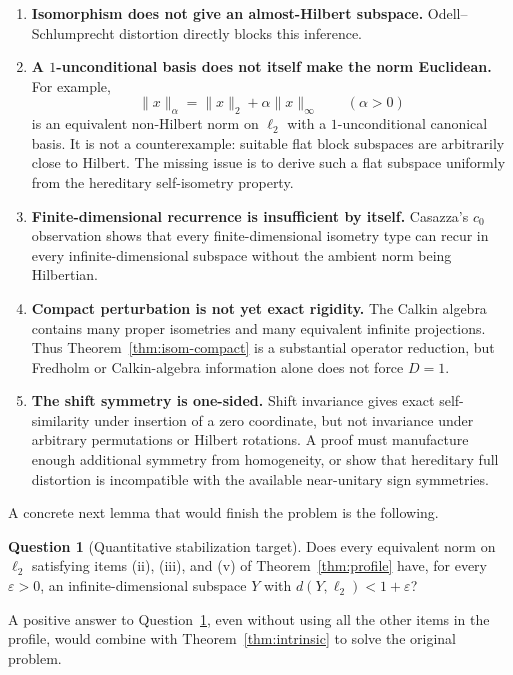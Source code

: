 \documentclass[11pt]{article}
\theoremstyle{definition}
\newtheorem{question}[theorem]{Question}
\begin{document}
\begin{enumerate}[label=\textbf{B\arabic*.}]
\item \textbf{Isomorphism does not give an almost-Hilbert subspace.}
Odell--Schlumprecht distortion directly blocks this inference.

\item \textbf{A $1$-unconditional basis does not itself make the norm
Euclidean.}  For example,
\[
 \|x\|_\alpha=\|x\|_2+\alpha\|x\|_\infty
 \qquad(\alpha>0)
\]
is an equivalent non-Hilbert norm on $\ell_2$ with a $1$-unconditional
canonical basis.  It is not a counterexample: suitable flat block subspaces
are arbitrarily close to Hilbert.  The missing issue is to derive such a flat
subspace uniformly from the hereditary self-isometry property.

\item \textbf{Finite-dimensional recurrence is insufficient by itself.}
Casazza's $c_0$ observation shows that every finite-dimensional isometry type
can recur in every infinite-dimensional subspace without the ambient norm
being Hilbertian.

\item \textbf{Compact perturbation is not yet exact rigidity.}
The Calkin algebra contains many proper isometries and many equivalent
infinite projections.  Thus Theorem~\ref{thm:isom-compact} is a substantial
operator reduction, but Fredholm or Calkin-algebra information alone does not
force $D=1$.

\item \textbf{The shift symmetry is one-sided.}  Shift invariance gives exact
self-similarity under insertion of a zero coordinate, but not invariance under
arbitrary permutations or Hilbert rotations.  A proof must manufacture enough
additional symmetry from homogeneity, or show that hereditary full distortion
is incompatible with the available near-unitary sign symmetries.
\end{enumerate}

A concrete next lemma that would finish the problem is the following.

\begin{question}[Quantitative stabilization target]\label{q:target}
Does every equivalent norm on $\ell_2$ satisfying items (ii), (iii), and (v) of
Theorem~\ref{thm:profile} have, for every $\varepsilon>0$, an
infinite-dimensional subspace $Y$ with
$d(Y,\ell_2)<1+\varepsilon$?
\end{question}

A positive answer to Question~\ref{q:target}, even without using all the other
items in the profile, would combine with Theorem~\ref{thm:intrinsic} to solve
the original problem.
\end{document}
